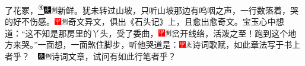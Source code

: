 了花冢，\href{../Text/part0031_split_000.html\#lnkback_4_a}{\textsuperscript{④}}{\includegraphics[width=3mm]{../Images/00004}\includegraphics[width=3mm]{../Images/00011}\footnotesize \kaishu 新鲜。}犹未转过山坡，只听山坡那边有呜咽之声，一行数落着，哭的好不伤感。{\includegraphics[width=3mm]{../Images/00002}\includegraphics[width=3mm]{../Images/00011}\footnotesize \kaishu 奇文异文，俱出《石头记》上，且愈出愈奇文。}宝玉心中想道：``这不知是那房里的丫头，受了委曲，{\includegraphics[width=3mm]{../Images/00002}\includegraphics[width=3mm]{../Images/00011}\footnotesize \kaishu 岔开线络，活泼之至！}跑到这个地方来哭。''一面想，一面煞住脚步，听他哭道是：{\includegraphics[width=3mm]{../Images/00002}\includegraphics[width=3mm]{../Images/00012}\footnotesize \kaishu 诗词歌赋，如此章法写于书上者乎？　\includegraphics[width=3mm]{../Images/00004}\includegraphics[width=3mm]{../Images/00011}\footnotesize \kaishu 诗词文章，试问有如此行笔者乎？}

